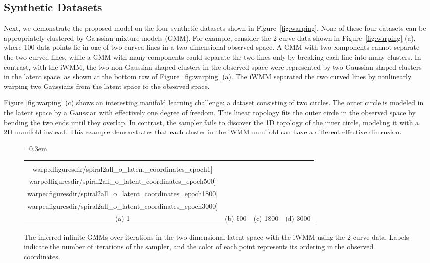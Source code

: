 \subsection{Synthetic Datasets}
Next, we demonstrate the proposed model on the four synthetic datasets shown in Figure~\ref{fig:warping}.
None of these four datasets can be appropriately clustered by Gaussian mixture models (GMM).
For example, consider the 2-curve data shown in Figure~\ref{fig:warping} (a), where 100 data points lie in one of two curved lines in a two-dimensional observed space.
A GMM with two components cannot separate the two curved lines, while a GMM with many components could separate the two lines only by breaking each line into many clusters. 
In contrast, with the iWMM, the two non-Gaussian-shaped clusters in the observed space were represented by two Gaussian-shaped clusters in the latent space, as shown at the bottom row of Figure~\ref{fig:warping} (a).
The iWMM separated the two curved lines by nonlinearly warping two Gaussians from the latent space to the observed space.

Figure \ref{fig:warping} (c) shows an interesting manifold learning challenge: a dataset consisting of two circles.  The outer circle is modeled in the latent space by a Gaussian with effectively one degree of freedom.  This linear topology fits the outer circle in the observed space by bending the two ends until they overlap.  In contrast, the sampler fails to discover the 1D topology of the inner circle, modeling it with a 2D manifold instead.  This example demonstrates that each cluster in the iWMM manifold can have a different effective dimension.

\begin{figure*}[t!]
\centering
{\tabcolsep=0.3em
\begin{tabular}{cccc}
\fbox{\texttt{[image: \\warpedfiguresdir/spiral2all\_o\_latent\_coordinates\_epoch1]}}&
\fbox{\texttt{[image: \\warpedfiguresdir/spiral2all\_o\_latent\_coordinates\_epoch500]}} & 
\fbox{\texttt{[image: \\warpedfiguresdir/spiral2all\_o\_latent\_coordinates\_epoch1800]}}&
\fbox{\texttt{[image: \\warpedfiguresdir/spiral2all\_o\_latent\_coordinates\_epoch3000]}}\\
(a) 1 & (b) 500 & (c) 1800 & (d) 3000 \\
\end{tabular}}
\caption[A visualization of a sampler for the iWMM]{The inferred infinite GMMs over iterations in the two-dimensional latent space with the iWMM using the 2-curve data. Labels indicate the number of iterations of the sampler, and the color of each point represents its ordering in the observed coordinates.}
\label{fig:infer}
\end{figure*}

